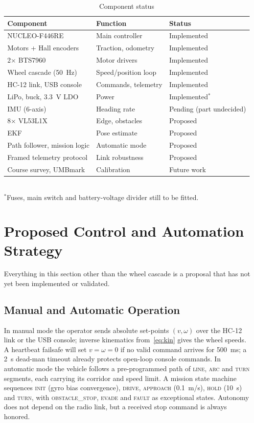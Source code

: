 \documentclass[conference]{IEEEtran}\newcommand{\haveieee}{}%
\begin{document}
\begin{table}[!t]
\caption{Component status}
\label{tab:status}
\centering\footnotesize
\setlength{\tabcolsep}{3pt}
\begin{tabular}{@{}p{3.1cm}p{2.7cm}p{1.5cm}@{}}
\toprule
\textbf{Component} & \textbf{Function} & \textbf{Status}\\
\midrule
NUCLEO-F446RE & Main controller & Implemented\\
Motors + Hall encoders & Traction, odometry & Implemented\\
2$\times$ BTS7960 & Motor drivers & Implemented\\
Wheel cascade (50~Hz) & Speed/position loop & Implemented\\
HC-12 link, USB console & Commands, telemetry & Implemented\\
LiPo, buck, 3.3~V LDO & Power & Implemented$^{*}$\\
IMU (6-axis) & Heading rate & Pending (part undecided)\\
8$\times$ VL53L1X & Edge, obstacles & Proposed\\
EKF & Pose estimate & Proposed\\
Path follower, mission logic & Automatic mode & Proposed\\
Framed telemetry protocol & Link robustness & Proposed\\
Course survey, UMBmark & Calibration & Future work\\
\bottomrule
\end{tabular}\\[1pt]
{\scriptsize $^{*}$Fuses, main switch and battery-voltage divider still to be fitted.}
\end{table}

\section{Proposed Control and Automation Strategy}
Everything in this section other than the wheel cascade is a proposal that has not yet been implemented or validated.

\subsection{Manual and Automatic Operation}
In manual mode the operator sends absolute set-points $(v,\omega)$ over the HC-12 link or the USB console; inverse kinematics from~\eqref{eq:kin} gives the wheel speeds. A heartbeat failsafe will set $v=\omega=0$ if no valid command arrives for 500~ms; a 2~s dead-man timeout already protects open-loop console commands. In automatic mode the vehicle follows a pre-programmed path of \textsc{line}, \textsc{arc} and \textsc{turn} segments, each carrying its corridor and speed limit. A mission state machine sequences \textsc{init} (gyro bias convergence), \textsc{drive}, \textsc{approach} (0.1~m/s), \textsc{hold} (10~s) and \textsc{turn}, with \textsc{obstacle\_stop}, \textsc{evade} and \textsc{fault} as exceptional states. Autonomy does not depend on the radio link, but a received stop command is always honored.
\end{document}
